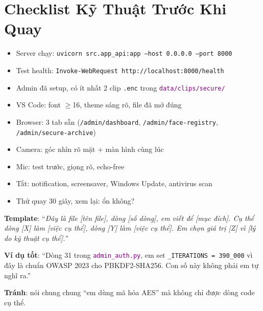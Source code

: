 \documentclass[12pt, a4paper]{article}
\newcommand{\fpath}[1]{\texttt{\textcolor{purple}{#1}}}
\begin{document}
\section{Checklist Kỹ Thuật Trước Khi Quay}

\begin{tcolorbox}[colback=OliveGreen!5, colframe=OliveGreen,
  title={\textbf{Checklist chung --- 3 người đều cần check}}]
\begin{itemize}
  \item[$\square$] Server chạy:
    \texttt{uvicorn src.app\_api:app --host 0.0.0.0 --port 8000}
  \item[$\square$] Test health: \texttt{Invoke-WebRequest http://localhost:8000/health}
  \item[$\square$] Admin đã setup, có ít nhất 2 clip \texttt{.enc} trong \fpath{data/clips/secure/}
  \item[$\square$] VS Code: font $\geq$16, theme sáng rõ, file đã mở đúng
  \item[$\square$] Browser: 3 tab sẵn (\texttt{/admin/dashboard}, \texttt{/admin/face-registry}, \texttt{/admin/secure-archive})
  \item[$\square$] Camera: góc nhìn rõ mặt + màn hình cùng lúc
  \item[$\square$] Mic: test trước, giọng rõ, echo-free
  \item[$\square$] Tắt: notification, screensaver, Windows Update, antivirus scan
  \item[$\square$] Thử quay 30 giây, xem lại: ổn không?
\end{itemize}
\end{tcolorbox}

\begin{tcolorbox}[colback=Goldenrod!8, colframe=Goldenrod,
  title={\textbf{Khi được hỏi về code: công thức trả lời chuẩn}}]
\textbf{Template}: ``\textit{Đây là file [tên file], dòng [số dòng], em viết để [mục đích].
Cụ thể dòng [X] làm [việc cụ thể], dòng [Y] làm [việc cụ thể].
Em chọn giá trị [Z] vì [lý do kỹ thuật cụ thể].}''

\textbf{Ví dụ tốt}: ``Dòng 31 trong \fpath{admin\_auth.py}, em set \texttt{\_ITERATIONS = 390\_000}
vì đây là chuẩn OWASP 2023 cho PBKDF2-SHA256. Con số này không phải em tự nghĩ ra.''

\textbf{Tránh}: nói chung chung ``em dùng mã hóa AES'' mà không chỉ được dòng code cụ thể.
\end{tcolorbox}
\end{document}
